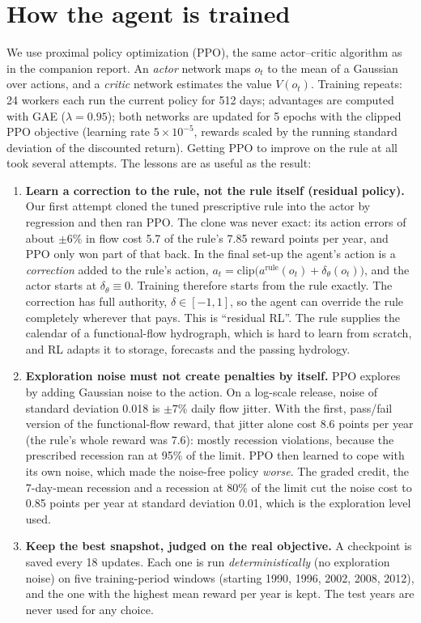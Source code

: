 \documentclass[11pt]{article}
\begin{document}
\section{How the agent is trained}
\label{sec:training}
We use proximal policy optimization (PPO), the same actor--critic algorithm
as in the companion report. An \emph{actor} network maps $o_t$ to the mean of
a Gaussian over actions, and a \emph{critic} network estimates the value
$V(o_t)$. Training repeats: 24 workers each run the current policy for 512
days; advantages are computed with GAE ($\lambda=0.95$); both networks are
updated for 5 epochs with the clipped PPO objective (learning rate
$5\times10^{-5}$, rewards scaled by the running standard deviation of the
discounted return). Getting PPO to improve on the rule at all took several
attempts. The lessons are as useful as the result:

\begin{enumerate}
\item \textbf{Learn a correction to the rule, not the rule itself
  (residual policy).} Our first attempt cloned the tuned prescriptive rule
  into the actor by regression and then ran PPO. The clone was never exact:
  its action errors of about $\pm6\%$ in flow cost 5.7 of the rule's 7.85
  reward points per year, and PPO only won part of that back. In the final
  set-up the agent's action is a \emph{correction} added to the rule's
  action, $a_t=\mathrm{clip}\big(a^{\mathrm{rule}}(o_t)+\delta_\theta(o_t)\big)$,
  and the actor starts at $\delta_\theta\equiv0$. Training therefore starts
  from the rule exactly. The correction has full authority, $\delta\in[-1,1]$,
  so the agent can override the rule completely wherever that pays. This is
  ``residual RL''. The rule supplies the calendar of a functional-flow
  hydrograph, which is hard to learn from scratch, and RL adapts it to
  storage, forecasts and the passing hydrology.
\item \textbf{Exploration noise must not create penalties by itself.} PPO
  explores by adding Gaussian noise to the action. On a log-scale release,
  noise of standard deviation 0.018 is $\pm7\%$ daily flow jitter. With the
  first, pass/fail version of the functional-flow reward, that jitter alone
  cost 8.6 points per year (the rule's whole reward was 7.6): mostly
  recession violations, because the prescribed recession ran at 95\% of
  the limit. PPO then learned to cope with its own noise, which made the
  noise-free policy \emph{worse}. The graded credit, the 7-day-mean
  recession and a recession at 80\% of the limit cut the noise cost to
  0.85 points per year at standard deviation 0.01, which is the
  exploration level used.
\item \textbf{Keep the best snapshot, judged on the real objective.} A
  checkpoint is saved every 18 updates. Each one is run
  \emph{deterministically} (no exploration noise) on five training-period
  windows (starting 1990, 1996, 2002, 2008, 2012), and the one with the
  highest mean reward per year is kept. The test years are never used for
  any choice.
\end{enumerate}
\end{document}
